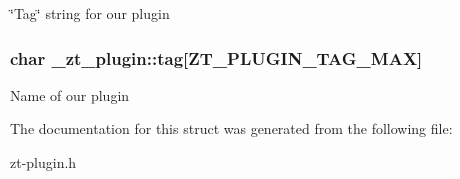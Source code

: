 \char`\"{}\-Tag\char`\"{} string for our plugin \hypertarget{struct__zt__plugin_a7e9fac40f4abc315830dfd6e26d34f02}{
\subsubsection[{tag}]{\setlength{\rightskip}{0pt plus 5cm}char \-\_\-zt\-\_\-plugin\-::tag\mbox{[}Z\-T\-\_\-\-P\-L\-U\-G\-I\-N\-\_\-\-T\-A\-G\-\_\-\-M\-A\-X\mbox{]}}}\label{struct__zt__plugin_a7e9fac40f4abc315830dfd6e26d34f02}
Name of our plugin 

The documentation for this struct was generated from the following file\-:\begin{DoxyCompactItemize}
\item 
zt-\/plugin.\-h\end{DoxyCompactItemize}

